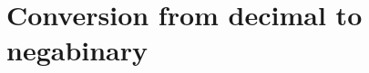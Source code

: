 \documentclass[11pt,a4paper]{article}
\author{Christian Rinderknecht}
\date{3 December 2008}
\begin{document}
\maketitle
\thispagestyle{empty}

\section{Conversion from decimal to negabinary}


\end{document}
